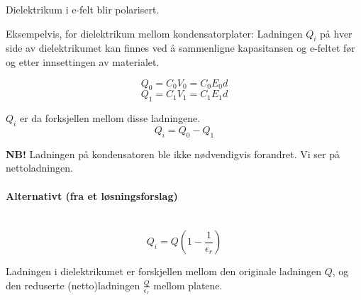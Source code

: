 Dielektrikum i e-felt blir polarisert.

Eksempelvis, for dielektrikum mellom kondensatorplater:
Ladningen $Q_i$ på hver side av dielektrikumet kan finnes ved å
sammenligne kapasitansen og e-feltet før og etter innsettingen av materialet.

$$Q_0 = C_0 V_0 = C_0 E_0 d$$
$$Q_1 = C_1 V_1 = C_1 E_1 d$$

$Q_i$ er da forksjellen mellom disse ladningene.
$$Q_i = Q_0 - Q_1$$

\textbf{NB!} Ladningen på kondensatoren ble ikke nødvendigvis forandret.
Vi ser på nettoladningen.


\paragraph{Alternativt (fra et løsningsforslag)} \hfill \\
$$Q_i = Q\left( 1 - \frac{1}{\epsilon_r} \right)$$

Ladningen i dielektrikumet er forskjellen mellom den originale
ladningen $Q$,
og den reduserte (netto)ladningen $\frac{Q}{\epsilon_r}$ mellom platene.
